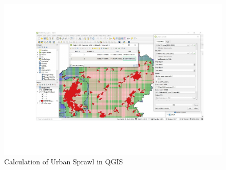 \documentclass[]{article}
\begin{document}
\begin{figure}[H]

{\centering \includegraphics[width=1\linewidth]{vignette_QGIS_files/figure-latex/unnamed-chunk-4-1} 

}

\caption{Calculation of Urban Sprawl in QGIS}\label{fig:unnamed-chunk-4}
\end{figure}
\end{document}

